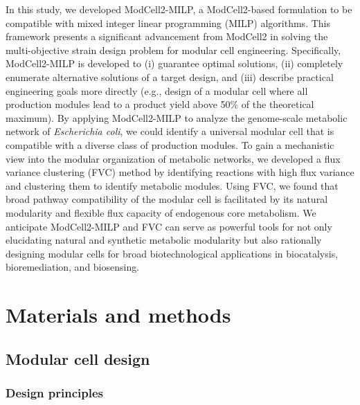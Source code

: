 In this study, we developed ModCell2-MILP, a ModCell2-based formulation to be compatible with mixed integer linear programming (MILP) algorithms. This framework presents a significant advancement from ModCell2 in solving the multi-objective strain design problem for modular cell engineering. Specifically, ModCell2-MILP is developed to (i) guarantee optimal solutions, (ii) completely enumerate alternative solutions of a target design, and (iii) describe practical engineering goals more directly (e.g., design of a modular cell where all production modules lead to a product yield above 50\% of the theoretical maximum). By applying ModCell2-MILP to analyze the genome-scale metabolic network of \textit{Escherichia coli}, we could identify a universal modular cell that is compatible with a diverse class of production modules. To gain a mechanistic view into the modular organization of metabolic networks, we developed a flux variance clustering (FVC) method by identifying reactions with high flux variance and clustering them to identify metabolic modules. Using FVC, we found that broad pathway compatibility of the modular cell is facilitated by its natural modularity and flexible flux capacity of endogenous core metabolism. We anticipate ModCell2-MILP and FVC can serve as powerful tools for not only elucidating natural and synthetic metabolic modularity but also rationally designing modular cells for broad biotechnological applications in biocatalysis, bioremediation, and biosensing.

\section{Materials and methods}
\subsection{Modular cell design}
\subsubsection{Design principles}

